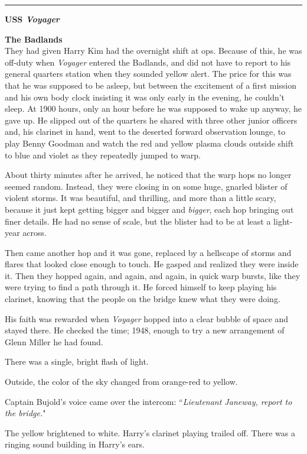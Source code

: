 \documentclass[twoside,letterpaper,12pt]{memoir}
\begin{document}
\fancybreak{\rule{3cm}{0.4 pt}}
\noindent\textbf{USS \textit{Voyager}}

\noindent\textbf{The Badlands}\\

They had given Harry Kim had the overnight shift at ops. Because of this, he was off-duty when \textit{Voyager} entered the Badlands, and did not have to report to his general quarters station when they sounded yellow alert. The price for this was that he was supposed to be asleep, but between the excitement of a first mission and his own body clock insisting it was only early in the evening, he couldn't sleep. At 1900 hours, only an hour before he was supposed to wake up anyway, he gave up. He slipped out of the quarters he shared with three other junior officers and, his clarinet in hand, went to the deserted forward observation lounge, to play Benny Goodman and watch the red and yellow plasma clouds outside shift to blue and violet as they repeatedly jumped to warp.

About thirty minutes after he arrived, he noticed that the warp hops no longer seemed random. Instead, they were closing in on some huge, gnarled blister of violent storms. It was beautiful, and thrilling, and more than a little scary, because it just kept getting bigger and bigger and \textit{bigger}, each hop bringing out finer details. He had no sense of scale, but the blister had to be at least a light-year across.

Then came another hop and it was gone, replaced by a hellscape of storms and flares that looked close enough to touch. He gasped and realized they were inside it. Then they hopped again, and again, and again, in quick warp bursts, like they were trying to find a path through it. He forced himself to keep playing his clarinet, knowing that the people on the bridge knew what they were doing.

His faith was rewarded when \textit{Voyager} hopped into a clear bubble of space and stayed there. He checked the time; 1948, enough to try a new arrangement of Glenn Miller he had found.

There was a single, bright flash of light.

Outside, the color of the sky changed from orange-red to yellow.

Captain Bujold's voice came over the intercom: ``\textit{Lieutenant Janeway, report to the bridge.}"

The yellow brightened to white. Harry’s clarinet playing trailed off. There was a ringing sound building in Harry's ears.
\end{document}
